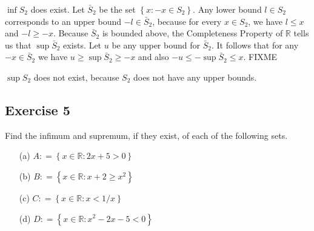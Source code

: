 \documentclass[12pt]{article}
\begin{document}
$\inf S_2$ does exist. Let $\bar{S}_2$ be the set $\left\{x : -x \in S_2\right\}$. Any lower bound $l \in S_2$ corresponds to an upper bound $-l \in \bar{S}_2$, because for every $x \in S_2$, we have $l \leq x$ and $-l \geq -x$. Because $\bar{S}_2$ is bounded above, the Completeness Property of $\mathbb{R}$ tells us that $\sup \bar{S}_2$ exists. Let $u$ be any upper bound for $\bar{S}_2$. It follows that for any $-x \in \bar{S}_2$ we have $u \geq \sup \bar{S}_2 \geq -x$ and also $-u \leq -\sup\bar{S}_2 \leq x$. FIXME

$\sup S_2$ does not exist, because $S_2$ does not have any upper bounds.

\subsection*{Exercise 5}
Find the infimum and supremum, if they exist, of each of the following sets.
\begin{itemize}
\item[(a)] $A \mathrel{\mathop:}= \left\{x \in \mathbb{R} : 2x + 5 > 0\right\}$
\item[(b)] $B \mathrel{\mathop:}= \left\{x \in \mathbb{R} : x + 2 \geq x^2\right\}$
\item[(c)] $C \mathrel{\mathop:}= \left\{x \in \mathbb{R} : x < 1/x\right\}$
\item[(d)] $D \mathrel{\mathop:}= \left\{x \in \mathbb{R} : x^2 - 2x - 5 < 0\right\}$
\end{itemize}
\end{document}

